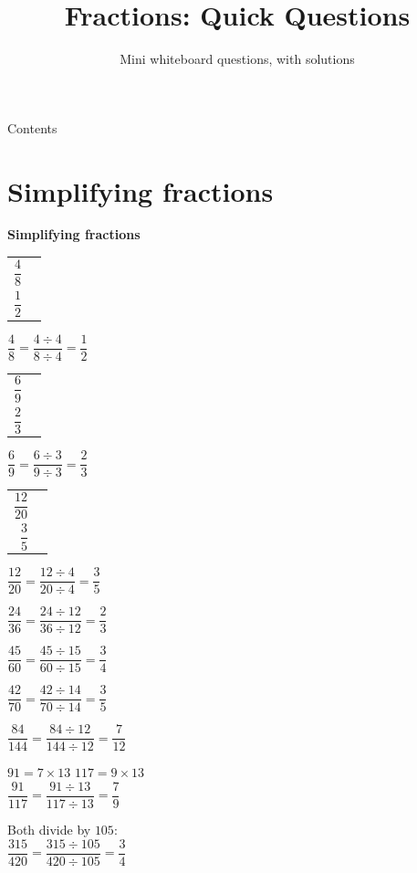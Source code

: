 \documentclass[aspectratio=169]{beamer}
\title{Fractions: Quick Questions}
\subtitle{Mini whiteboard questions, with solutions}
\author{}
\date{}
\makeatletter
\newcommand{\qtopic}[1]{%
  \section{#1}%
  \begin{frame}[plain]
    \vfill
    \begin{center}
      {\usebeamercolor[fg]{structure}\Huge\bfseries #1}
    \end{center}
    \vfill
  \end{frame}%
}
\newcommand{\barstack}[1]{%
  {\renewcommand{\arraystretch}{1.2}%
   \begin{tabular}{@{}r@{\;\;}l@{}}#1\end{tabular}}%
}
\makeatother
\begin{document}
\frame{\titlepage}

\begin{frame}{Contents}
  \small
  \tableofcontents
\end{frame}

\qtopic{Simplifying fractions}

  {\barstack{$\dfrac{4}{8}$ & \fbar{8}{4} \\[0.95em]
             $\dfrac{1}{2}$ & \fbar{2}{1}}
   \par\vspace{0.6em}
   $\dfrac{4}{8}=\dfrac{4\div 4}{8\div 4}=\dfrac{1}{2}$}

  {\barstack{$\dfrac{6}{9}$ & \fbar{9}{6} \\[0.95em]
             $\dfrac{2}{3}$ & \fbar{3}{2}}
   \par\vspace{0.6em}
   $\dfrac{6}{9}=\dfrac{6\div 3}{9\div 3}=\dfrac{2}{3}$}

  {\barstack{$\dfrac{12}{20}$ & \fbar{20}{12} \\[0.95em]
             $\dfrac{3}{5}$ & \fbar{5}{3}}
   \par\vspace{0.6em}
   $\dfrac{12}{20}=\dfrac{12\div 4}{20\div 4}=\dfrac{3}{5}$}

  {$\dfrac{24}{36}=\dfrac{24\div 12}{36\div 12}=\dfrac{2}{3}$}

  {$\dfrac{45}{60}=\dfrac{45\div 15}{60\div 15}=\dfrac{3}{4}$}

  {$\dfrac{42}{70}=\dfrac{42\div 14}{70\div 14}=\dfrac{3}{5}$}

  {$\dfrac{84}{144}=\dfrac{84\div 12}{144\div 12}=\dfrac{7}{12}$}

  {$91=7\times 13$ \qquad $117=9\times 13$\\[0.4em]
   $\dfrac{91}{117}=\dfrac{91\div 13}{117\div 13}=\dfrac{7}{9}$}

  {Both divide by $105$:\\[0.4em]
   $\dfrac{315}{420}=\dfrac{315\div 105}{420\div 105}=\dfrac{3}{4}$}
\end{document}
